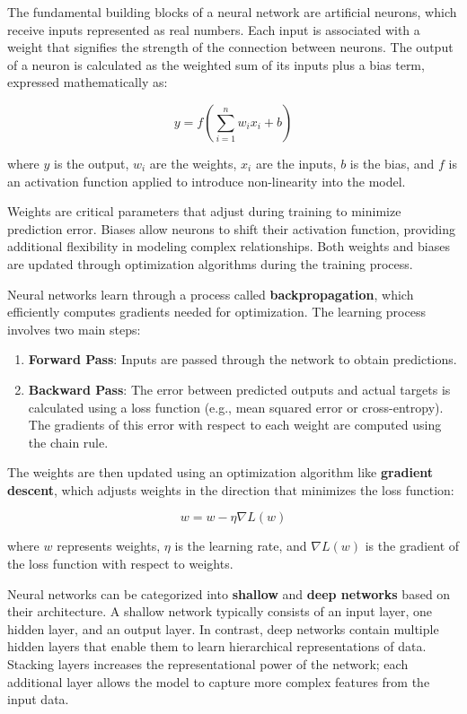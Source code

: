 The fundamental building blocks of a neural network are artificial neurons, which receive inputs represented as real numbers. Each input is associated with a weight that signifies the strength of the connection between neurons. The output of a neuron is calculated as the weighted sum of its inputs plus a bias term, expressed mathematically as:

\[
y = f\left(\sum_{i=1}^{n} w_i x_i + b\right)
\]

where \(y\) is the output, \(w_i\) are the weights, \(x_i\) are the inputs, \(b\) is the bias, and \(f\) is an activation function applied to introduce non-linearity into the model.

Weights are critical parameters that adjust during training to minimize prediction error. Biases allow neurons to shift their activation function, providing additional flexibility in modeling complex relationships. Both weights and biases are updated through optimization algorithms during the training process.

Neural networks learn through a process called \textbf{backpropagation}, which efficiently computes gradients needed for optimization. The learning process involves two main steps: 

\begin{enumerate}
    \item \textbf{Forward Pass}: Inputs are passed through the network to obtain predictions.
    \item \textbf{Backward Pass}: The error between predicted outputs and actual targets is calculated using a loss function (e.g., mean squared error or cross-entropy). The gradients of this error with respect to each weight are computed using the chain rule.
\end{enumerate}

The weights are then updated using an optimization algorithm like \textbf{gradient descent}, which adjusts weights in the direction that minimizes the loss function:

\[
w = w - \eta \nabla L(w)
\]

where \(w\) represents weights, \(\eta\) is the learning rate, and \(\nabla L(w)\) is the gradient of the loss function with respect to weights.

Neural networks can be categorized into \textbf{shallow} and \textbf{deep networks} based on their architecture. A shallow network typically consists of an input layer, one hidden layer, and an output layer. In contrast, deep networks contain multiple hidden layers that enable them to learn hierarchical representations of data. Stacking layers increases the representational power of the network; each additional layer allows the model to capture more complex features from the input data.

